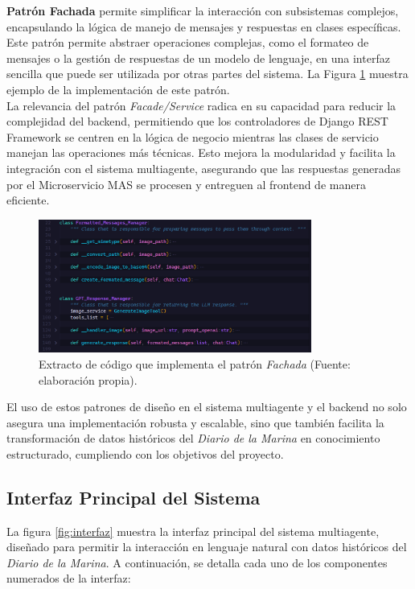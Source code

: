 \textbf{Patrón Fachada} permite simplificar la interacción con subsistemas complejos, encapsulando la lógica de manejo de mensajes y respuestas en clases específicas. Este patrón permite abstraer operaciones complejas, como el formateo de mensajes o la gestión de respuestas de un modelo de lenguaje, en una interfaz sencilla que puede ser utilizada por otras partes del sistema. La Figura \ref{fig:codigo_facade} muestra ejemplo de la implementación de este patrón.\\
La relevancia del patrón \textit{Facade/Service} radica en su capacidad para reducir la complejidad del backend, permitiendo que los controladores de Django REST Framework se centren en la lógica de negocio mientras las clases de servicio manejan las operaciones más técnicas. Esto mejora la modularidad y facilita la integración con el sistema multiagente, asegurando que las respuestas generadas por el Microservicio MAS se procesen y entreguen al frontend de manera eficiente.

\begin{figure}[htbp]
	\centering
	\includegraphics[width=0.8\textwidth]{images/fachada.PNG}
	\caption{Extracto de código que implementa el patrón \textit{Fachada} (Fuente: elaboración propia).}
	\label{fig:codigo_facade}
\end{figure}

El uso de estos patrones de diseño en el sistema multiagente y el backend no solo asegura una implementación robusta y escalable, sino que también facilita la transformación de datos históricos del \textit{Diario de la Marina} en conocimiento estructurado, cumpliendo con los objetivos del proyecto.



\subsection{Interfaz Principal del Sistema}

La figura \ref{fig:interfaz} muestra la interfaz principal del sistema multiagente, diseñado para permitir la interacción en lenguaje natural con datos históricos del \textit{Diario de la Marina}. A continuación, se detalla cada uno de los componentes numerados de la interfaz:

